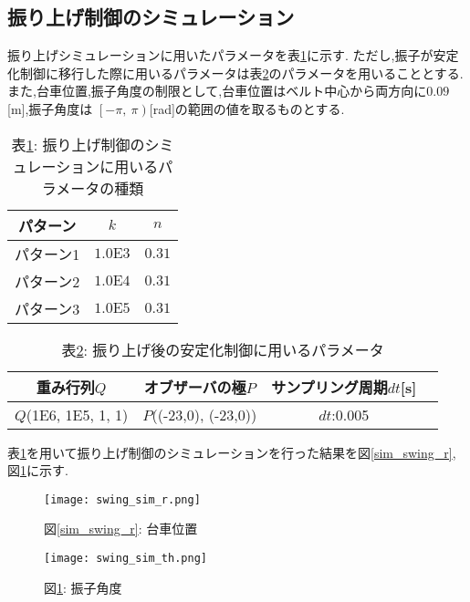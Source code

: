 \subsection{振り上げ制御のシミュレーション}
振り上げシミュレーションに用いたパラメータを表\ref{sim_swing}に示す.
ただし,振子が安定化制御に移行した際に用いるパラメータは表\ref{swing_stable}のパラメータを用いることとする.
また,台車位置,振子角度の制限として,台車位置はベルト中心から両方向に$0.09$[m],振子角度は
$\left[-\pi\right.,\ \left.\pi\right)$[rad]の範囲の値を取るものとする.

\begin{table}[htbp]
    \begin{center}
        \caption{表\ref{sim_swing}: 振り上げ制御のシミュレーションに用いるパラメータの種類}
        \begin{tabular}{|c|c|c|} \hline
            パターン & $k$ & $n$ \\ \hline \hline
            パターン1 & $1.0\mbox{E}3$ & $0.31$ \\ \hline
            パターン2 & $1.0\mbox{E}4$ & $0.31$ \\ \hline
            パターン3 & $1.0\mbox{E}5$ & $0.31$ \\ \hline
        \end{tabular}
        \label{sim_swing}
    \end{center}
\end{table}

\begin{table}[htbp]
    \begin{center}
        \caption{表\ref{swing_stable}: 振り上げ後の安定化制御に用いるパラメータ}
        \begin{tabular}{|c|c|c|c|} \hline
            重み行列$Q$ & オブザーバの極$P$ & サンプリング周期$dt$[s] \\ \hline \hline
            $Q$(1E6, 1E5, 1, 1) & $P$((-23,0), (-23,0)) & $dt$:0.005 \\ \hline
          \end{tabular}
        \label{swing_stable}
    \end{center}
\end{table}

表\ref{sim_swing}を用いて振り上げ制御のシミュレーションを行った結果を図\ref{sim_swing_r},
図\ref{sim_swing_th}に示す.

\begin{figure}[htbp]
    \begin{minipage}{0.5\hsize}
        \begin{center}
            \texttt{[image: swing\_sim\_r.png]}
            \caption{図\ref{sim_swing_r}: 台車位置}
            \label{sim_swing_r}
        \end{center}
    \end{minipage}
    \begin{minipage}{0.5\hsize}
        \begin{center}
            \texttt{[image: swing\_sim\_th.png]}
            \caption{図\ref{sim_swing_th}: 振子角度}
            \label{sim_swing_th}
        \end{center}
    \end{minipage}
\end{figure}

